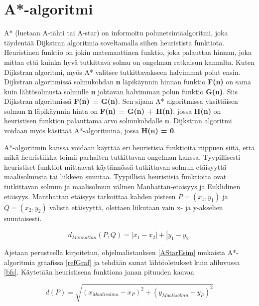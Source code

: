 \section{A*-algoritmi}\label{aStar}
A* (luetaan A-tähti tai A-star) on informoitu polunetsintäalgoritmi, joka 
täydentää Dijkstran algoritmia soveltamalla siihen heuristista 
funktiota.\cite{MathewAndMalathy} Heuristinen funktio on jokin matemaattinen 
funktio, joka palauttaa hinnan, joka mittaa että kuinka hyvä tutkittava 
solmu on ongelman ratkaisun kannalta. Kuten Dijkstran algoritmi, myös A* 
valitsee tutkittavakseen halvimmat polut ensin.\cite{DelaunayVoronoiAStar} 
Dijkstran algoritmissä solmukohdan \textbf{n} läpikäynnin hinnan funktio 
\textbf{F(n)} on sama kuin lähtösolmusta solmulle \textbf{n} johtavan 
halvimman polun funktio \textbf{G(n)}. Siis Dijkstran algoritmissä 
\textbf{F(n) = G(n)}.\cite{MathewAndMalathy} Sen sijaan A* algoritmissa 
yksittäisen solmun \textbf{n} läpikäynnin hinta on 
\textbf{F(n) = G(n) + H(n)}, jossa \textbf{H(n)} on heuristisen funktion 
palauttama arvo solmukohdalle \textbf{n}.\cite{DelaunayVoronoiAStar} 
Dijkstran algoritmi voidaan myös käsittää A*-algoritminä, jossa 
\textbf{H(n) = 0}.\cite{MathewAndMalathy}\par 
	A*-algoritmin kanssa voidaan käyttää eri heuristisia funktioita 
riippuen siitä, että mikä heuristiikka toimii parhaiten tutkittavan ongelman 
kanssa. Tyypillisesti heuristiset funktiot mittaavat käytännössä tutkittavan 
solmun etäisyyttä maalisolmusta tai liikkeen suuntaa.\cite{ProcediaAStar} 
Tyypillisiä heuristisia funktioita ovat tutkittavan solmun ja maalisolmun 
välinen Manhattan-etäisyys ja Euklidinen etäisyys.\cite{MathewAndMalathy} 
Manthattan etäisyys tarkoittaa kahden pisteen $P = (x_1,y_1)$ ja 
$Q = (x_2,y_2)$ välistä etäisyyttä, olettaen liikutaan vain x- ja 
y-akselien suuntaisesti.\cite{MathewAndMalathy}

\[ d_{Manhattan}(P,Q) =  |x_1 - x_2| + |y_1 - y_2|\]
\par

	Ajetaan \textcite{MathewAndMalathy} perusteella kirjoitetun, 
ohjelmalistauksen \ref{AStarEsim} mukaista A*-algoritmia graafissa 
\ref{refGraf} ja tehdään samat lähtöoletukset kuin aliluvussa \ref{bfs}. 
Käytetään heuristisena funktiona janan pituuden kaavaa

\[ d(P) = \sqrt{(x_{Maalisolmu}-x_P)^2 + (y_{Maalisolmu}-y_P)^2} \]

